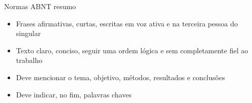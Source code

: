 {\fontsize{17}{0}\selectfont Normas ABNT resumo}
\begin{itemize}
\item Frases afirmativas, curtas, escritas em voz ativa e na terceira pessoa do singular
\item Texto claro, conciso, seguir uma ordem lógica e sem completamente fiel ao trabalho
\item Deve mencionar o tema, objetivo, métodos, resultados e conclusões
\item Deve indicar, no fim, palavras chaves
\end{itemize}
